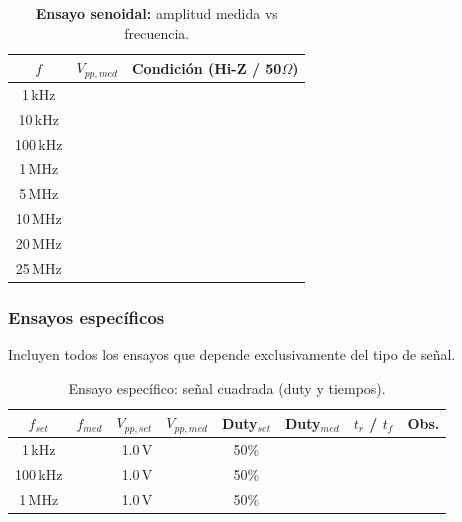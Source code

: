 \begin{table}[H]
	\centering
	\label{tab:sine_flatness_basic}
	\begin{tabular}{|c |r| l|}
		\hline
		$f$ & $V_{pp,med}$ & Condición (Hi-Z / 50$\Omega$) \\
		\hline
		1\,kHz    &  & \\ \hline
		10\,kHz   &  & \\ \hline
		100\,kHz  &  & \\ \hline
		1\,MHz    &  & \\ \hline
		5\,MHz    &  & \\ \hline
		10\,MHz   &  & \\ \hline
		20\,MHz   &  & \\
		\hline
		25\,MHz   &  & \\
		\hline
	\end{tabular}
	\caption{\textbf{Ensayo senoidal:} amplitud medida vs frecuencia.}
\end{table}

\subsubsection{Ensayos específicos}
Incluyen todos los ensayos que depende exclusivamente del tipo de señal.

\begin{table}[H]
	\centering
	\label{tab:square_duty_rise}
	\begin{tabular}{|c| r| r| r| c| r| r| l|}
		\hline
		$f_{set}$ & $f_{med}$ &
		$V_{pp,set}$ & $V_{pp,med}$ &
		Duty$_{set}$ & Duty$_{med}$ &
		$t_r$ / $t_f$ &
		Obs. \\
		\hline
		1\,kHz   &  & 1.0\,V &  & 50\% &  &  & \\ \hline
		100\,kHz &  & 1.0\,V &  & 50\% &  &  & \\ \hline
		1\,MHz   &  & 1.0\,V &  & 50\% &  &  & \\
		\hline
	\end{tabular}
	\caption{Ensayo específico: señal cuadrada (duty y tiempos).}
\end{table}


%
%

